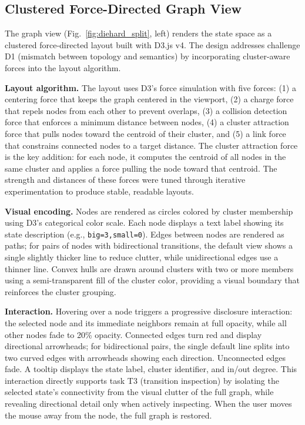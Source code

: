 \documentclass[conference]{IEEEtran}
\begin{document}
\subsection{Clustered Force-Directed Graph View}

The graph view (Fig.~\ref{fig:diehard_split}, left) renders the state space as a clustered force-directed layout built with D3.js v4. The design addresses challenge D1 (mismatch between topology and semantics) by incorporating cluster-aware forces into the layout algorithm.

\textbf{Layout algorithm.} The layout uses D3's force simulation with five forces: (1) a centering force that keeps the graph centered in the viewport, (2) a charge force that repels nodes from each other to prevent overlaps, (3) a collision detection force that enforces a minimum distance between nodes, (4) a cluster attraction force that pulls nodes toward the centroid of their cluster, and (5) a link force that constrains connected nodes to a target distance. The cluster attraction force is the key addition: for each node, it computes the centroid of all nodes in the same cluster and applies a force pulling the node toward that centroid. The strength and distances of these forces were tuned through iterative experimentation to produce stable, readable layouts.

\textbf{Visual encoding.} Nodes are rendered as circles colored by cluster membership using D3's categorical color scale. Each node displays a text label showing its state description (e.g., \texttt{big=3,small=0}). Edges between nodes are rendered as paths; for pairs of nodes with bidirectional transitions, the default view shows a single slightly thicker line to reduce clutter, while unidirectional edges use a thinner line. Convex hulls are drawn around clusters with two or more members using a semi-transparent fill of the cluster color, providing a visual boundary that reinforces the cluster grouping.

\textbf{Interaction.} Hovering over a node triggers a progressive disclosure interaction: the selected node and its immediate neighbors remain at full opacity, while all other nodes fade to 20\% opacity. Connected edges turn red and display directional arrowheads; for bidirectional pairs, the single default line splits into two curved edges with arrowheads showing each direction. Unconnected edges fade. A tooltip displays the state label, cluster identifier, and in/out degree. This interaction directly supports task T3 (transition inspection) by isolating the selected state's connectivity from the visual clutter of the full graph, while revealing directional detail only when actively inspecting. When the user moves the mouse away from the node, the full graph is restored.
\end{document}
